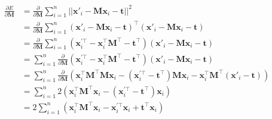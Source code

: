 \documentclass[letterpaper, 11pt]{article}
\begin{document}
\begin{align*}
    \frac{\partial E}{\partial \textbf{M}} & = \frac{\partial}{\partial\textbf{M}}\sum_{i=1}^{n} ||\textbf{x}'_i-\textbf{M}\textbf{x}_i-\textbf{t}||^2                                                                                                                                   \\
                                           & = \frac{\partial}{\partial\textbf{M}}\sum_{i=1}^{n} (\textbf{x}'_i-\textbf{M}\textbf{x}_i-\textbf{t})^\top (\textbf{x}'_i-\textbf{M}\textbf{x}_i-\textbf{t})                                                                                \\
                                           & =\frac{\partial}{\partial\textbf{M}}\sum_{i=1}^{n} (\textbf{x}_i^{'\top}-\textbf{x}_i^{\top}\textbf{M}^{\top}-\textbf{t}^{\top}) (\textbf{x}'_i-\textbf{M}\textbf{x}_i-\textbf{t})                                                          \\
                                           & =\sum_{i=1}^{n} \frac{\partial}{\partial\textbf{M}}(\textbf{x}_i^{'\top}-\textbf{x}_i^{\top}\textbf{M}^{\top}-\textbf{t}^{\top}) (\textbf{x}'_i-\textbf{M}\textbf{x}_i-\textbf{t})                                                          \\
                                           & =\sum_{i=1}^{n} \frac{\partial}{\partial\textbf{M}}(\textbf{x}_i^{\top}\textbf{M}^{\top}\textbf{M}\textbf{x}_i-(\textbf{x}_i^{'\top}-\textbf{t}^\top)\textbf{M}\textbf{x}_i-\textbf{x}_i^{\top}\textbf{M}^{\top}(\textbf{x}'_i-\textbf{t})) \\
                                           & =\sum_{i=1}^{n} 2(\textbf{x}_i^{\top}\textbf{M}^{\top}\textbf{x}_i-(\textbf{x}_i^{'\top}-\textbf{t}^\top)\textbf{x}_i)                                                                                                                      \\
                                           & =2\sum_{i=1}^{n} (\textbf{x}_i^{\top}\textbf{M}^{\top}\textbf{x}_i-\textbf{x}_i^{'\top}\textbf{x}_i+\textbf{t}^\top\textbf{x}_i)                                                                                                            \\
\end{align*}
\end{document}
